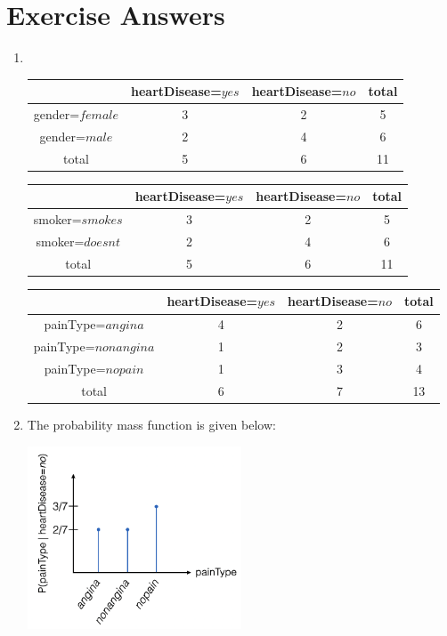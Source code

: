 \section{Exercise Answers}



\begin{enumerate}

\item \


\begin{tabular}{|c|c|c|c|}\hline
& heartDisease=$yes$ & heartDisease=$no$ & total \\ \hline
gender=$female$ & 3 & 2 & 5 \\ \hline
gender=$male$ & 2 & 4 & 6 \\ \hline
total & 5 & 6 & 11 \\ \hline
\end{tabular}

\vspace{0.5cm}

\begin{tabular}{|c|c|c|c|}\hline
& heartDisease=$yes$ & heartDisease=$no$ & total \\ \hline
smoker=$smokes$ & 3 & 2 & 5 \\ \hline
smoker=$doesnt$ & 2 & 4 & 6 \\ \hline
total & 5 & 6 & 11 \\ \hline
\end{tabular}

\vspace{0.5cm}

\begin{tabular}{|c|c|c|c|}\hline
& heartDisease=$yes$ & heartDisease=$no$ & total \\ \hline
painType=$angina$& 4 & 2 & 6 \\ \hline
painType=$nonangina$& 1 & 2 & 3 \\ \hline
painType=$nopain$ & 1 & 3 & 4 \\ \hline
total & 6 & 7 & 13 \\ \hline
\end{tabular}

\vspace{0.5cm}

\item The probability mass function is given below:

\includegraphics[width=0.5\textwidth]{"Part 3 - Learning Systems/Supervised Learning/Naive Bayes/figures/nb-mass-function-exercise.png"}


\end{enumerate}
